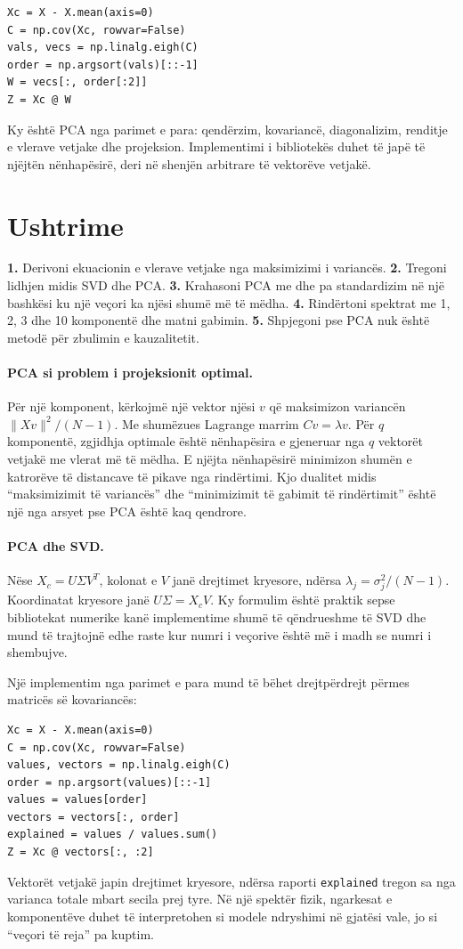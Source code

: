 \documentclass[12pt,a4paper,oneside]{book}
\begin{document}
\begin{lstlisting}
Xc = X - X.mean(axis=0)
C = np.cov(Xc, rowvar=False)
vals, vecs = np.linalg.eigh(C)
order = np.argsort(vals)[::-1]
W = vecs[:, order[:2]]
Z = Xc @ W
\end{lstlisting}
Ky është PCA nga parimet e para: qendërzim, kovariancë, diagonalizim, renditje e vlerave vetjake dhe projeksion. Implementimi i bibliotekës duhet të japë të njëjtën nënhapësirë, deri në shenjën arbitrare të vektorëve vetjakë.

\section{Ushtrime}

\textbf{1.} Derivoni ekuacionin e vlerave vetjake nga maksimizimi i variancës. \textbf{2.} Tregoni lidhjen midis SVD dhe PCA. \textbf{3.} Krahasoni PCA me dhe pa standardizim në një bashkësi ku një veçori ka njësi shumë më të mëdha. \textbf{4.} Rindërtoni spektrat me 1, 2, 3 dhe 10 komponentë dhe matni gabimin. \textbf{5.} Shpjegoni pse PCA nuk është metodë për zbulimin e kauzalitetit.


\paragraph{PCA si problem i projeksionit optimal.}
Për një komponent, kërkojmë një vektor njësi $v$ që maksimizon variancën $\|Xv\|^2/(N-1)$. Me shumëzues Lagrange marrim $Cv=\lambda v$. Për $q$ komponentë, zgjidhja optimale është nënhapësira e gjeneruar nga $q$ vektorët vetjakë me vlerat më të mëdha. E njëjta nënhapësirë minimizon shumën e katrorëve të distancave të pikave nga rindërtimi. Kjo dualitet midis ``maksimizimit të variancës'' dhe ``minimizimit të gabimit të rindërtimit'' është një nga arsyet pse PCA është kaq qendrore.

\paragraph{PCA dhe SVD.}
Nëse $X_c=U\Sigma V^T$, kolonat e $V$ janë drejtimet kryesore, ndërsa $\lambda_j=\sigma_j^2/(N-1)$. Koordinatat kryesore janë $U\Sigma=X_cV$. Ky formulim është praktik sepse bibliotekat numerike kanë implementime shumë të qëndrueshme të SVD dhe mund të trajtojnë edhe raste kur numri i veçorive është më i madh se numri i shembujve.

Një implementim nga parimet e para mund të bëhet drejtpërdrejt përmes matricës së kovariancës:
\begin{lstlisting}[caption={PCA nga kovarianca dhe dekompozimi në vlera vetjake.}]
Xc = X - X.mean(axis=0)
C = np.cov(Xc, rowvar=False)
values, vectors = np.linalg.eigh(C)
order = np.argsort(values)[::-1]
values = values[order]
vectors = vectors[:, order]
explained = values / values.sum()
Z = Xc @ vectors[:, :2]
\end{lstlisting}
Vektorët vetjakë japin drejtimet kryesore, ndërsa raporti \texttt{explained} tregon sa nga varianca totale mbart secila prej tyre. Në një spektër fizik, ngarkesat e komponentëve duhet të interpretohen si modele ndryshimi në gjatësi vale, jo si ``veçori të reja'' pa kuptim.
\end{document}
